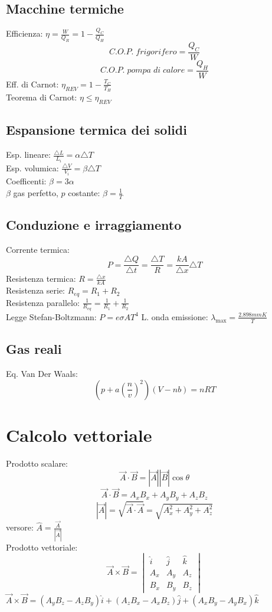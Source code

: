 \documentclass{article}
\begin{document}
\begin{small}
\begin{multicols}{3}
	\subsection{Macchine termiche}
		Efficienza: $ \eta = \frac{ W }{ Q_R } = 1 - \frac{ Q_C }{ Q_H } $
		\[ C.O.P. \; frigorifero = \frac{ Q_C }{ W } \]
		\[ C.O.P. \; pompa \; di \; calore = \frac{ Q_H }{ W } \]
		Eff. di Carnot: $ \eta_{REV} = 1 - \frac{ T_C }{ T_H } $ \\
		Teorema di Carnot: $ \eta \leq \eta_{REV} $
	\subsection{Espansione termica dei solidi}
		Esp. lineare: $ \frac{ \triangle L }{ L_i } = \alpha \triangle T $ \\
		Esp. volumica: $ \frac{ \triangle V }{ V_i } = \beta \triangle T $ \\
		Coefficenti: $ \beta = 3 \alpha $ \\
		$\beta$ gas perfetto, $p$ costante: $ \beta = \frac{1}{ T } $
	\subsection{Conduzione e irraggiamento}
		Corrente termica: \[ P = \frac{ \triangle Q }{ \triangle t } = \frac{ \triangle T }{ R } = \frac{ k A }{ \triangle x } \triangle T \]
		Resistenza termica: $ R = \frac{ \triangle x }{ k A } $ \\
		Resistenza serie: $ R_{eq} = R_1 + R_2 $ \\
		Resistenza parallelo: $ \frac{1}{ R_{eq} } = \frac{1}{ R_1 } + \frac{1}{ R_2 } $ \\
		Legge Stefan-Boltzmann: $ P = e \sigma A T^4 $
		L. onda emissione: $ \lambda_{\max} = \frac{ 2.898 mmK }{ T } $
	\subsection{Gas reali}
		Eq. Van Der Waals: \[ \left ( p + a \left ( \frac{ n }{ v } \right )^2 \right ) ( V - n b ) = n R T \]
\section{Calcolo vettoriale}
		Prodotto scalare:
		\[ \vec A \cdot \vec B = | \vec A | | \vec B | \cos \theta \]
		\[ \vec A \cdot \vec B = A_x B_x + A_y B_y + A_z B_z \]
		\[ | \vec A | = \sqrt{ \vec A \cdot \vec A } = \sqrt{ A_x^2 + A_y^2 + A_z^2 } \]
		versore: $ \hat A = \frac{ \vec A }{ | \vec A | } $ \\
		Prodotto vettoriale:
		\[ \vec A \times \vec B = \begin{vmatrix} \hat i & \hat j & \hat k \\ A_x & A_y & A_z \\ B_x & B_y & B_z \end{vmatrix} \]
		$ \vec A \times \vec B = ( A_y B_z - A_z B_y ) \hat i + ( A_z B_x - A_x B_z ) \hat j + ( A_x B_y - A_y B_x ) \hat k $

\end{multicols}
\end{small}
\end{document}
